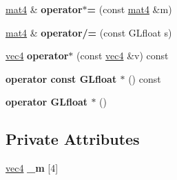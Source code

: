 \begin{DoxyCompactItemize}
\item 
\hypertarget{class_angel_1_1mat4_a36a1eca30d83a2bdbd7d2ec6675ee853}{\hyperlink{class_angel_1_1mat4}{mat4} \& {\bfseries operator$\ast$=} (const \hyperlink{class_angel_1_1mat4}{mat4} \&m)}\label{class_angel_1_1mat4_a36a1eca30d83a2bdbd7d2ec6675ee853}

\item 
\hypertarget{class_angel_1_1mat4_a0f8c1b50c454341ff26f006a0ff09788}{\hyperlink{class_angel_1_1mat4}{mat4} \& {\bfseries operator/=} (const G\-Lfloat s)}\label{class_angel_1_1mat4_a0f8c1b50c454341ff26f006a0ff09788}

\item 
\hypertarget{class_angel_1_1mat4_a820e0c317d1836cd224ff75f676c6f2f}{\hyperlink{struct_angel_1_1vec4}{vec4} {\bfseries operator$\ast$} (const \hyperlink{struct_angel_1_1vec4}{vec4} \&v) const }\label{class_angel_1_1mat4_a820e0c317d1836cd224ff75f676c6f2f}

\item 
\hypertarget{class_angel_1_1mat4_a93c2295529f8cde832378076837d202e}{{\bfseries operator const G\-Lfloat $\ast$} () const }\label{class_angel_1_1mat4_a93c2295529f8cde832378076837d202e}

\item 
\hypertarget{class_angel_1_1mat4_a83e8b31ac751f67e31985fc104e1a0e6}{{\bfseries operator G\-Lfloat $\ast$} ()}\label{class_angel_1_1mat4_a83e8b31ac751f67e31985fc104e1a0e6}

\end{DoxyCompactItemize}
\subsection*{Private Attributes}
\begin{DoxyCompactItemize}
\item 
\hypertarget{class_angel_1_1mat4_a927716d9eb0e35e6f577beca4a4fc243}{\hyperlink{struct_angel_1_1vec4}{vec4} {\bfseries \-\_\-m} \mbox{[}4\mbox{]}}\label{class_angel_1_1mat4_a927716d9eb0e35e6f577beca4a4fc243}

\end{DoxyCompactItemize}
